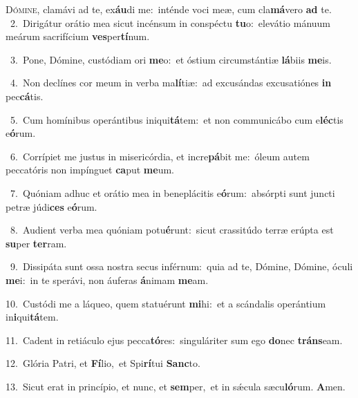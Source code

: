 \lettrine{\initial\textcolor{\initialcolor}{D}}{ómine,} clamávi ad te, ex\-\textbf{áu}\-di me:~\star inténde voci meæ, cum cla\-\textbf{má}\-vero \textbf{ad} te.\\
{\numbfont\textcolor{\numbcolor}{~2.}}~Dirigátur orátio mea sicut incénsum in conspéctu \textbf{tu}\-o:~\star elevátio mánuum meárum sacrifícium \textbf{ves}\-per\-\textbf{tí}\-num.\par
{\numbfont\textcolor{\numbcolor}{~3.}}~Pone, Dómine, custódiam ori \textbf{me}\-o:~\star et óstium circumstántiæ \textbf{lá}\-biis \textbf{me}\-is.\par
{\numbfont\textcolor{\numbcolor}{~4.}}~Non declínes cor meum in verba ma\-\textbf{lí}\-tiæ:~\star ad excusándas excusatiónes \textbf{in} pec\-\textbf{cá}\-tis.\par
{\numbfont\textcolor{\numbcolor}{~5.}}~Cum homínibus operántibus iniqui\-\textbf{tá}\-tem:~\star et non communicábo cum e\-\textbf{léc}\-tis e\-\textbf{ó}\-rum.\par
{\numbfont\textcolor{\numbcolor}{~6.}}~Corrípiet me justus in misericórdia, et incre\-\textbf{pá}\-bit me:~\star óleum autem peccatóris non impínguet \textbf{ca}\-put \textbf{me}\-um.\par
{\numbfont\textcolor{\numbcolor}{~7.}}~Quóniam adhuc et orátio mea in beneplácitis e\-\textbf{ó}\-rum:~\star absórpti sunt juncti petræ júdi\textbf{ces} e\-\textbf{ó}\-rum.\par
{\numbfont\textcolor{\numbcolor}{~8.}}~Audient verba mea quóniam potu\-\textbf{é}\-runt:~\star sicut crassitúdo terræ erúpta est \textbf{su}\-per \textbf{ter}\-ram.\par
{\numbfont\textcolor{\numbcolor}{~9.}}~Dissipáta sunt ossa nostra secus inférnum:~\dagger quia ad te, Dómine, Dómine, óculi \textbf{me}\-i:~\star in te sperávi, non áuferas \textbf{á}\-nimam \textbf{me}\-am.\par
{\numbfont\textcolor{\numbcolor}{10.}}~Custódi me a láqueo, quem statuérunt \textbf{mi}\-hi:~\star et a scándalis operántium in\-\textbf{i}\-qui\-\textbf{tá}\-tem.\par
{\numbfont\textcolor{\numbcolor}{11.}}~Cadent in retiáculo ejus pecca\-\textbf{tó}\-res:~\star singuláriter sum ego \textbf{do}\-nec \textbf{tráns}\-eam.\par
{\numbfont\textcolor{\numbcolor}{12.}}~Glória Patri, et \textbf{Fí}\-lio,~\star et Spi\-\textbf{rí}\-tui \textbf{Sanc}\-to.\par
{\numbfont\textcolor{\numbcolor}{13.}}~Sicut erat in princípio, et nunc, et \textbf{sem}\-per,~\star et in sǽcula sæcu\-\textbf{ló}\-rum. \textbf{A}\-men.\par
